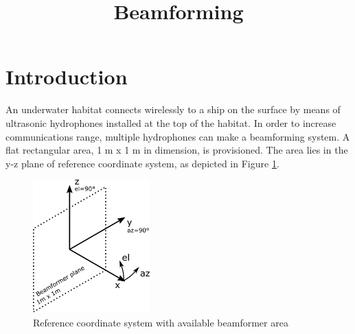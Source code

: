 \documentclass{article}[a4paper]
\title{Beamforming}
\begin{document}
\maketitle

\section*{Introduction}

An underwater habitat connects wirelessly to a ship on the surface by means of ultrasonic hydrophones installed at the top of the habitat. In order to increase communications range, multiple hydrophones can make a beamforming system. A flat rectangular area, 1 m x 1 m in dimension, is provisioned. The area lies in the y-z plane of reference coordinate system, as depicted in Figure \ref{fig:coord}.
\begin{figure}[h!]
   \centering
   \includegraphics[width=0.4\textwidth]{coord.png}
   \caption{Reference coordinate system with available beamformer area}
   \label{fig:coord}
\end{figure}
\end{document}
